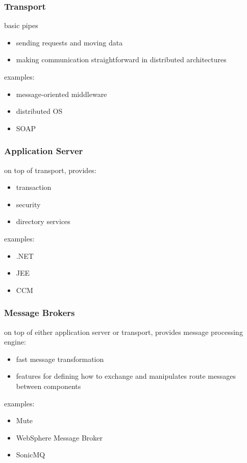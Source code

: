 \documentclass[]{article}
\theoremstyle{definition}
\begin{document}
	\subsubsection{Transport}
	basic pipes
	\begin{itemize}
		\item sending requests and moving data
		\item making communication straightforward in distributed architectures
	\end{itemize}
	examples:
	\begin{itemize}
		\item message-oriented middleware
		\item distributed OS
		\item SOAP
	\end{itemize}

	\subsubsection{Application Server}
	on top of transport, provides:
	\begin{itemize}
		\item transaction
		\item security
		\item directory services
	\end{itemize}
	examples:
	\begin{itemize}
		\item .NET
		\item JEE
		\item CCM
	\end{itemize}

	\subsubsection{Message Brokers}
	on top of either application server or transport, provides message processing engine:
	\begin{itemize}
		\item fast message transformation
		\item features for defining how to exchange and manipulates route messages between components
	\end{itemize}
	examples:
	\begin{itemize}
		\item Mute
		\item WebSphere Message Broker
		\item SonicMQ
	\end{itemize}
\end{document}
